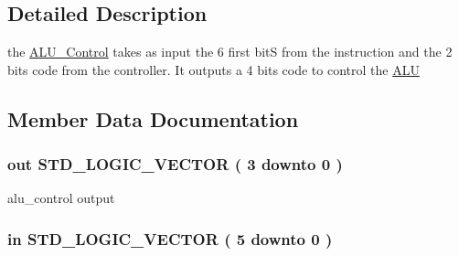\subsection{Detailed Description}
the \hyperlink{class_a_l_u___control}{A\-L\-U\-\_\-\-Control} takes as input the 6 first bit\-S from the instruction and the 2 bits code from the controller. It outputs a 4 bits code to control the \hyperlink{class_a_l_u}{A\-L\-U} 

\subsection{Member Data Documentation}
\hypertarget{class_a_l_u___control_a8ec3ba373cae4fe06c7d82b2ce12561f}{
\subsubsection[{A\-L\-U\-\_\-\-Control\-\_\-out}]{ {\bfseries \textcolor{vhdlkeyword}{out}\textcolor{vhdlchar}{ }} {\bfseries \textcolor{comment}{S\-T\-D\-\_\-\-L\-O\-G\-I\-C\-\_\-\-V\-E\-C\-T\-O\-R}\textcolor{vhdlchar}{ }\textcolor{vhdlchar}{(}\textcolor{vhdlchar}{ }\textcolor{vhdlchar}{ } \textcolor{vhdldigit}{3} \textcolor{vhdlchar}{ }\textcolor{vhdlchar}{ }\textcolor{vhdlchar}{ }\textcolor{vhdlkeyword}{downto}\textcolor{vhdlchar}{ }\textcolor{vhdlchar}{ }\textcolor{vhdlchar}{ } \textcolor{vhdldigit}{0} \textcolor{vhdlchar}{ }\textcolor{vhdlchar}{)}\textcolor{vhdlchar}{ }} \hspace{0.3cm}{\ttfamily [Port]}}}\label{class_a_l_u___control_a8ec3ba373cae4fe06c7d82b2ce12561f}


alu\-\_\-control output 

\hypertarget{class_a_l_u___control_a7a955f01ce8523310216d431d36b3355}{
\subsubsection[{A\-L\-U\-\_\-\-Funct\-\_\-\-In}]{ {\bfseries \textcolor{vhdlkeyword}{in}\textcolor{vhdlchar}{ }} {\bfseries \textcolor{comment}{S\-T\-D\-\_\-\-L\-O\-G\-I\-C\-\_\-\-V\-E\-C\-T\-O\-R}\textcolor{vhdlchar}{ }\textcolor{vhdlchar}{(}\textcolor{vhdlchar}{ }\textcolor{vhdlchar}{ } \textcolor{vhdldigit}{5} \textcolor{vhdlchar}{ }\textcolor{vhdlchar}{ }\textcolor{vhdlchar}{ }\textcolor{vhdlkeyword}{downto}\textcolor{vhdlchar}{ }\textcolor{vhdlchar}{ }\textcolor{vhdlchar}{ } \textcolor{vhdldigit}{0} \textcolor{vhdlchar}{ }\textcolor{vhdlchar}{)}\textcolor{vhdlchar}{ }} \hspace{0.3cm}{\ttfamily [Port]}}}\label{class_a_l_u___control_a7a955f01ce8523310216d431d36b3355}


